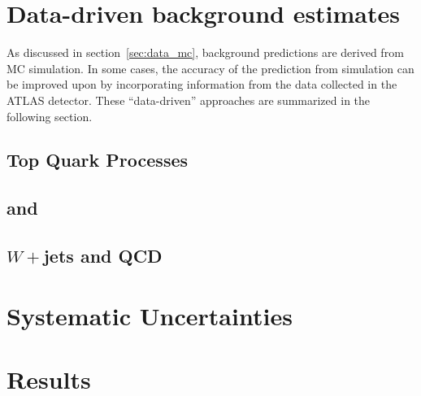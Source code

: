 \section{Data-driven background estimates}
\label{chap:analysis:sec:dd_backgrounds}

As discussed in section~\ref{sec:data_mc}, background predictions are
derived from MC simulation. In some cases, the accuracy of the
prediction from simulation can be improved upon by incorporating
information from the data collected in the ATLAS detector. These
``data-driven'' approaches are summarized in the following section.

\subsection{Top Quark Processes}
\label{chap:analysis:sec:dd_backgrounds:subsec:top}


%

%

\subsection{\ZDYll and \Ztautau}
\label{chap:analysis:sec:dd_backgrounds:subsec:zdy}


\subsection{$W+$jets and QCD}
\label{chap:analysis:sec:dd_backgrounds:subsec:fakes}


\section{Systematic Uncertainties}
\label{chap:analysis:sec:systematics}


\section{Results}
\label{chap:analysis:sec:results}


